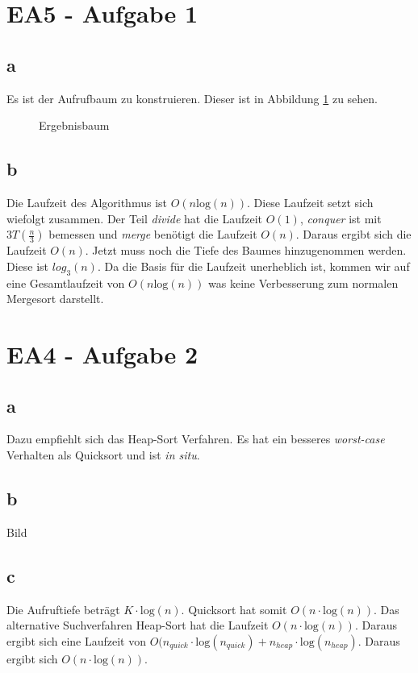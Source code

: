 \documentclass[12pt]{article}
\begin{document}
\section*{EA5 - Aufgabe 1}

\subsection*{a}
Es ist der Aufrufbaum zu konstruieren. Dieser ist in Abbildung \ref{img:abb1} zu sehen.
\begin{figure}[h]
	\centering
	\scalebox{.5}{}
	\caption{Ergebnisbaum}
	\label{img:abb1}
\end{figure}
\subsection*{b}
Die Laufzeit des Algorithmus ist $O(n \text{log}(n))$. Diese Laufzeit setzt sich wiefolgt zusammen. Der Teil
\textit{divide} hat die Laufzeit $O(1)$, \textit{conquer} ist mit $3T(\frac{n}{3})$ bemessen und \textit{merge}
benötigt die Laufzeit $O(n)$. Daraus ergibt sich die Laufzeit $O(n)$. Jetzt muss noch die Tiefe des Baumes
hinzugenommen werden. Diese ist $log_3 (n)$. Da die Basis für die Laufzeit unerheblich ist, kommen wir auf eine
Gesamtlaufzeit von $O(n\text{log}(n))$ was keine Verbesserung zum normalen Mergesort darstellt.

\section*{EA4 - Aufgabe 2}

\subsection*{a}
Dazu empfiehlt sich das Heap-Sort Verfahren. Es hat ein besseres \textit{worst-case} Verhalten als Quicksort und ist
\textit{in situ}.

\subsection*{b}
Bild

\subsection*{c}
Die Aufruftiefe beträgt $K \cdot \text{log}(n)$. Quicksort hat somit $O(n \cdot \text{log}(n))$. Das 
alternative Suchverfahren Heap-Sort hat die Laufzeit $O(n \cdot \text{log}(n))$. Daraus ergibt sich eine Laufzeit
von $O( n_{quick} \cdot \text{log}(n_{quick}) +  n_{heap} \cdot \text{log}(n_{heap})$. Daraus ergibt sich $O(n \cdot \text{log}(n))$.
\end{document}
